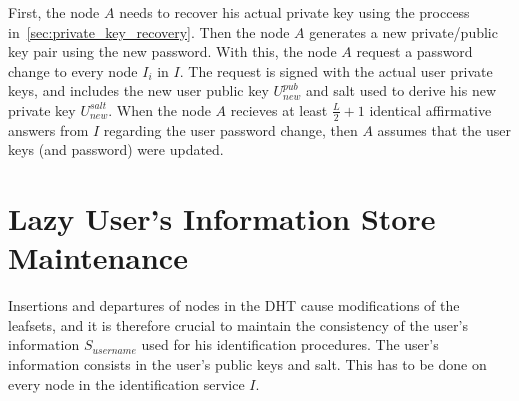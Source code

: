 First, the node $A$ needs to recover his actual private key using the proccess
in~\ref{sec:private_key_recovery}. Then the node $A$ generates a new private/public
key pair using the new password.  With this, the node $A$ request a
password change to every node $I_i$ in $I$. The request is signed with the
actual user private keys, and includes the new user public key $U^{pub}_{new}$
and salt used to derive his new private key $U^{salt}_{new}$. 
 When the node $A$ recieves at least $\frac{L}{2} + 1$ identical affirmative
answers from $I$ regarding the user password change, then $A$ assumes that the
user keys (and password) were updated.



\section{Lazy User's Information Store Maintenance}
Insertions and departures of nodes in the DHT cause modifications of the
leafsets, and it is therefore crucial to maintain the consistency of the user's
information $S_{username}$ used for his identification procedures. The user's information
consists in the user's public keys and salt. This has to be done on every node in the identification service
$I$.\\

